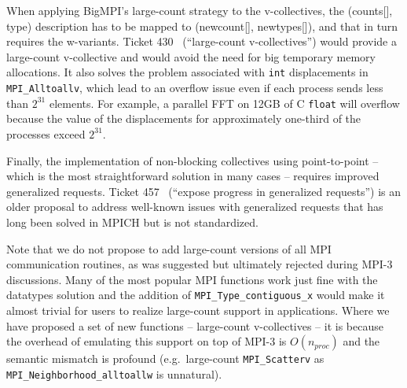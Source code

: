 When applying BigMPI's large-count strategy to the v-collectives, the (counts[], type) description 
has to be mapped to (newcount[], newtypes[]), and that in turn requires the w-variants.
Ticket 430~\cite{ticket430}
(``large-count v-collectives'') 
would provide a large-count v-collective and would avoid the need for big temporary memory allocations.
It also solves the problem associated with \texttt{int} displacements in \texttt{MPI\_Alltoallv}, which lead to
an overflow issue even if each process sends less than $2^{31}$ elements.
For example, a parallel FFT on 12GB of C \texttt{float} will overflow because the value of the displacements
for approximately one-third of the processes exceed $2^{31}$.

Finally, the implementation of non-blocking collectives using point-to-point --
which is the most straightforward solution in many cases -- 
requires improved generalized requests.
Ticket 457~\cite{ticket457} %
(``expose progress in generalized requests'') is an older proposal to address well-known
issues with generalized requests that has long been solved in MPICH but is not standardized.

Note that we do not propose to add large-count versions of all MPI communication routines,
as was suggested but ultimately rejected during MPI-3 discussions.
Many of the most popular MPI functions work just fine with the datatypes solution and
the addition of \texttt{MPI\_Type\_contiguous\_x} would make it almost trivial for users to
realize large-count support in applications.
Where we have proposed a set of new functions -- large-count v-collectives -- it is because
the overhead of emulating this support on top of MPI-3 is $O(n_{proc})$ and the semantic mismatch is
profound (e.g.\ large-count \texttt{MPI\_Scatterv} as \texttt{MPI\_Neighborhood\_alltoallw} is unnatural).


